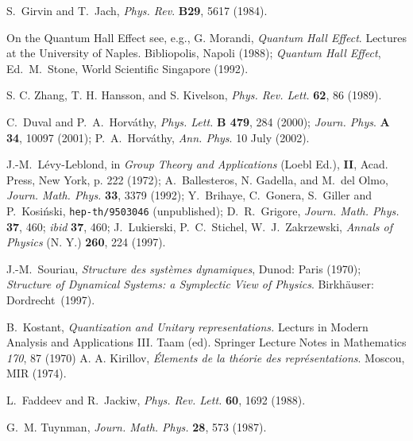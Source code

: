 \documentclass[a4paper,12pt]{article}
\begin{document}
\begin{thebibliography}{0}
S.~Girvin and T.~Jach,
{\it Phys. Rev}. {\bf B29}, 5617 (1984).

On the Quantum Hall Effect see, e.g.,
G. Morandi, {\it Quantum Hall Effect}. Lectures at the University of
Naples. Bibliopolis, Napoli (1988);
{\it Quantum Hall Effect},
Ed.~M.~Stone, World Scientific Singapore (1992).

S. C. Zhang, T. H. Hansson, and S. Kivelson,
{\it Phys. Rev. Lett.} {\bf 62}, 86 (1989).

C.~Duval and P.~A.~Horv\'athy,
{\it Phys. Lett.} {\bf B 479}, 284 (2000);
{\it Journ. Phys}. {\bf A 34}, 10097 (2001); 
 P.~A.~Horv\'athy, {\it Ann. Phys}. 10 July (2002).

J.-M.~L\'evy-Leblond,
in {\it Group Theory and Applications} (Loebl Ed.),
{\bf II}, Acad. Press, New York, p. 222 (1972);
A.~Ballesteros, N. Gadella, and M.~del Olmo,
 {\it Journ. Math. Phys.} {\bf 33}, 3379 (1992);
Y.~Brihaye, C.~Gonera, S.~Giller and P.~Kosi\'nski,
\texttt {hep-th/9503046} (unpublished);
D.~R.~Grigore,
 {\it Journ. Math. Phys.} {\bf 37}, 460;
{\it ibid} {\bf 37}, 460;
J.~Lukierski, P.~C.~Stichel, W.~J.~Zakrzewski,
{\it Annals of Physics}  (N. Y.) {\bf 260}, 224 (1997).

J.-M.~Souriau,
{\it Structure des syst\`emes dynamiques},
Dunod: Paris (1970);
{\it Structure of Dynamical Systems: a Symplectic View of Physics}.
Birkh\"auser: Dordrecht~(1997).

B.~Kostant, {\it Quantization and Unitary representations.}
Lecturs in Modern Analysis and Applications III. Taam (ed).
Springer Lecture Notes in Mathematics {\it 170}, 87 (1970)
A. A. Kirillov, {\it\'Elements de la th\'eorie des repr\'esentations}.
Moscou, MIR (1974). 

L.~Faddeev and R.~Jackiw,
{\it Phys. Rev. Lett.} {\bf 60}, 1692 (1988). 

 G.~M. Tuynman,
{\it Journ. Math. Phys.} {\bf 28}, 573 (1987).

\end{thebibliography}
\end{document}
